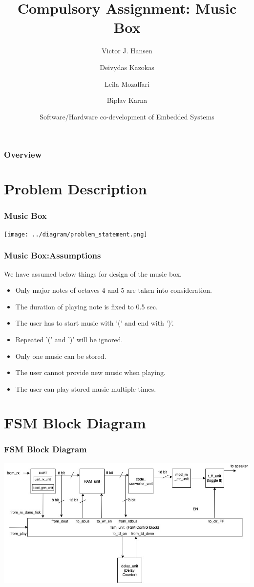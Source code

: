 \documentclass{beamer}
\title{Compulsory Assignment: Music Box}
\author[Victor, Deivydas, Leila, Biplav]{Victor J. Hansen\inst{1}
\and Deivydas Kazokas\inst{2} \break
\and Leila Mozaffari\inst{3}
\and Biplav Karna\inst{4}
}
\institute{USN Kongsberg}
\date[ES-SHC4300,Feb 2020]{ Software/Hardware co-development of Embedded Systems }
\begin{document}
 
\frame{\titlepage}
 
\begin{frame}
\frametitle{Overview}
\tableofcontents
\end{frame}

\section{Problem Description}
\begin{frame}
\frametitle{Music Box}
\texttt{[image: ../diagram/problem\_statement.png]}
\end{frame}
 
\begin{frame}
\frametitle{Music Box:Assumptions}
We have assumed below things for design of the music box.
\begin{itemize}
\item Only major notes of octaves 4 and 5 are taken into consideration.
\item The duration of playing note is fixed to 0.5 sec.
\item The user has to start music with '(' and end with ')'.
\item Repeated '(' and ')' will be ignored.
\item Only one music can be stored.
\item The user cannot provide new music when playing.
\item The user can play stored music multiple times.
\end {itemize}
\end{frame}

\section{FSM Block Diagram}
\begin{frame}
\frametitle{FSM Block Diagram}
\includegraphics[width=\textwidth,height=0.8\textheight] {../diagram/ccw_music_player-fsm_block_diagram.jpg}
\end{frame}
 
\end{document}
